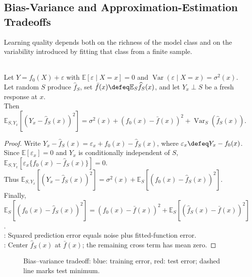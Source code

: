 \subsection{Bias-Variance and Approximation-Estimation Tradeoffs}

Learning quality depends both on the richness of the model class and on the variability introduced by fitting that class from a finite sample.

\begin{proposition} \label{prop:sl-bias-variance-regression} \\
Let $Y=f_0(X)+\varepsilon$ with $\mathbb{E}[\varepsilon\mid X=x]=0$ and $\operatorname{Var}(\varepsilon\mid X=x)=\sigma^2(x)$.\\
Let random $S$ produce $\widehat{f}_S$, set $\bar{f}(x)\defeq\mathbb{E}_S\widehat{f}_S(x)$, and let $Y_x\perp S$ be a fresh response at $x$.\\
Then $\mathbb{E}_{S,Y_x}[(Y_x-\widehat{f}_S(x))^2]=\sigma^2(x)+(f_0(x)-\bar{f}(x))^2+\operatorname{Var}_S(\widehat{f}_S(x))$.
\begin{proof} Write $Y_x-\widehat{f}_S(x)=\varepsilon_x+f_0(x)-\widehat{f}_S(x)$, where $\varepsilon_x\defeq Y_x-f_0(x)$.\\
Since $\mathbb{E}[\varepsilon_x]=0$ and $Y_x$ is conditionally independent of $S$, $\mathbb{E}_{S,Y_x}[\varepsilon_x\{f_0(x)-\widehat{f}_S(x)\}]=0$.\\
Thus $\mathbb{E}_{S,Y_x}[(Y_x-\widehat{f}_S(x))^2]=\sigma^2(x)+\mathbb{E}_S[(f_0(x)-\widehat{f}_S(x))^2]$.\\
Finally, $\mathbb{E}_S[(f_0(x)-\widehat{f}_S(x))^2]=(f_0(x)-\bar{f}(x))^2+\mathbb{E}_S[(\widehat{f}_S(x)-\bar{f}(x))^2]$.\\
: Squared prediction error equals noise plus fitted-function error.\\
: Center $\widehat{f}_S(x)$ at $\bar{f}(x)$; the remaining cross term has mean zero.
\end{proof}
\end{proposition}

\begin{figure}[H]
  \centering
  
  \caption{Bias--variance tradeoff: \textcolor{blue!70!black}{blue}: training error, \textcolor{red!75!black}{red}: test error; dashed line marks test minimum.}
  \label{fig:sl-bias-variance-model-complexity}
\end{figure}


